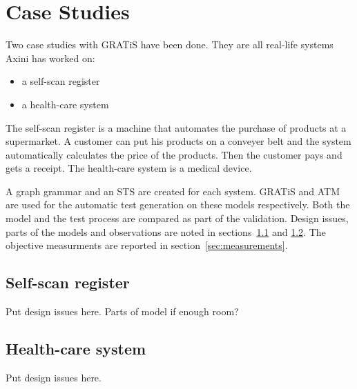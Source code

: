\section{Case Studies}\label{sec:case-studies}

Two case studies with GRATiS have been done. They are all real-life systems Axini has worked on:
\begin{itemize}
  \item a self-scan register
  \item a health-care system 
\end{itemize}  

The self-scan register is a machine that automates the purchase of products at a supermarket. A customer can put his products on a conveyer belt and the system automatically calculates the price of the products. Then the customer pays and gets a receipt. The health-care system is a medical device.

A graph grammar and an STS are created for each system. GRATiS and ATM are used for the automatic test generation on these models respectively. Both the model and the test process are compared as part of the validation. Design issues, parts of the models and observations are noted in sections~\ref{sec:self-scan} and \ref{sec:health-care}. The objective measurments are reported in section~\ref{sec:measurements}.

\subsection{Self-scan register}\label{sec:self-scan}
Put design issues here. Parts of model if enough room?

\subsection{Health-care system}\label{sec:health-care}
Put design issues here. 
